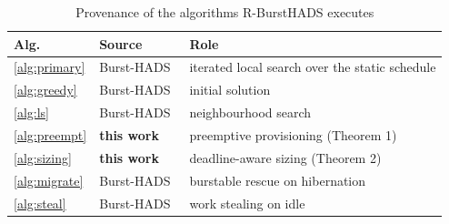 \documentclass[conference]{IEEEtran}
\begin{document}
\begin{table}[t]
\caption{Provenance of the algorithms R-BurstHADS executes}
\label{tab:algprov}
\centering
\footnotesize
\begin{tabular}{@{}llp{3.0cm}@{}}
\toprule
Alg. & Source & Role \\
\midrule
\ref{alg:primary} & Burst-HADS~\cite{bursthads} & iterated local search over the static schedule \\
\ref{alg:greedy}  & Burst-HADS~\cite{bursthads} & initial solution \\
\ref{alg:ls}      & Burst-HADS~\cite{bursthads} & neighbourhood search \\
\ref{alg:preempt} & \textbf{this work} & preemptive provisioning (Theorem 1) \\
\ref{alg:sizing}  & \textbf{this work} & deadline-aware sizing (Theorem 2) \\
\ref{alg:migrate} & Burst-HADS~\cite{bursthads} & burstable rescue on hibernation \\
\ref{alg:steal}   & Burst-HADS~\cite{bursthads} & work stealing on idle \\
\bottomrule
\end{tabular}
\end{table}
\end{document}
